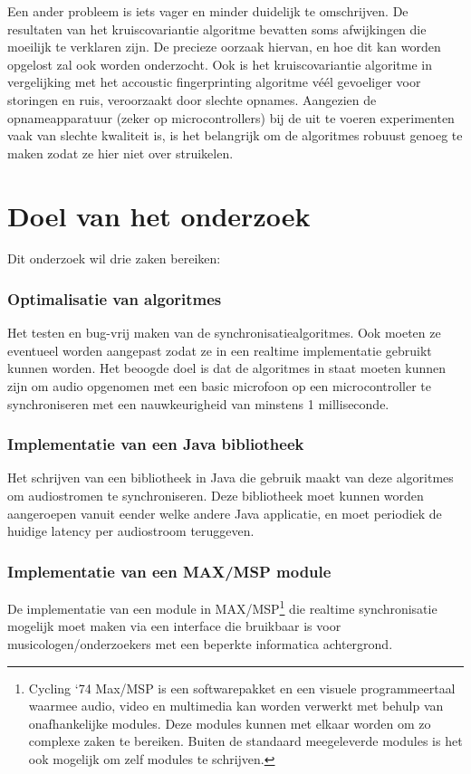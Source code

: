 Een ander probleem is iets vager en minder duidelijk te omschrijven. De resultaten van het kruiscovariantie algoritme bevatten soms afwijkingen die moeilijk te verklaren zijn. De precieze oorzaak hiervan, en hoe dit kan worden opgelost zal ook worden onderzocht. Ook is het kruiscovariantie algoritme in vergelijking met het accoustic fingerprinting algoritme véél gevoeliger voor storingen en ruis, veroorzaakt door slechte opnames. Aangezien de opnameapparatuur (zeker op microcontrollers) bij de uit te voeren experimenten vaak van slechte kwaliteit is, is het belangrijk om de algoritmes robuust genoeg te maken zodat ze hier niet over struikelen.

\section{Doel van het onderzoek}

Dit onderzoek wil drie zaken bereiken: 

\subsubsection{Optimalisatie van algoritmes}
Het testen en bug-vrij maken van de synchronisatiealgoritmes. Ook moeten ze eventueel worden aangepast zodat ze in een realtime implementatie gebruikt kunnen worden. Het beoogde doel is dat de algoritmes in staat moeten kunnen zijn om audio opgenomen met een basic microfoon op een microcontroller te synchroniseren met een nauwkeurigheid van minstens 1 milliseconde.

\subsubsection{Implementatie van een Java bibliotheek}
Het schrijven van een bibliotheek in Java die gebruik maakt van deze algoritmes om audiostromen te synchroniseren. Deze bibliotheek moet kunnen worden aangeroepen vanuit eender welke andere Java applicatie, en moet periodiek de huidige latency per audiostroom teruggeven.

\subsubsection{Implementatie van een MAX/MSP module}
De implementatie van een module in MAX/MSP\footnote{Cycling ‘74 Max/MSP is een softwarepakket en een visuele programmeertaal waarmee audio, video en multimedia kan worden verwerkt met behulp van onafhankelijke modules. Deze modules kunnen met elkaar worden om zo complexe zaken te bereiken. Buiten de standaard meegeleverde modules is het ook mogelijk om zelf modules te schrijven.\cite{maxmsp2016}} die realtime synchronisatie mogelijk moet maken via een interface die bruikbaar is voor musicologen/onderzoekers met een beperkte informatica achtergrond.

